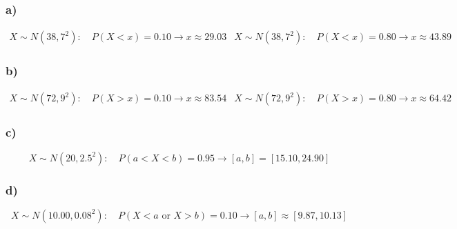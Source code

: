 	\subsubsection*{a)}
	\[
	\begin{array}{ll}
		X\sim N(38,7^2):\quad P(X<x)=0.10 \longrightarrow x\approx 29.03
		&
		X\sim N(38,7^2):\quad P(X<x)=0.80 \longrightarrow x\approx 43.89
	\end{array}
	\]
	
	\subsubsection*{b)}
	\[
	\begin{array}{ll}
		X\sim N(72,9^2):\quad P(X>x)=0.10 \longrightarrow x\approx 83.54
		&
		X\sim N(72,9^2):\quad P(X>x)=0.80 \longrightarrow x\approx 64.42
	\end{array}
	\]
	
	\subsubsection*{c)}
	\[
	X\sim N(20,2.5^2):\quad P(a<X<b)=0.95 \longrightarrow [a,b]=[15.10,24.90]
	\]
	
	\subsubsection*{d)}
	\[
	X\sim N(10.00,0.08^2):\quad P(X<a\text{ or }X>b)=0.10 \longrightarrow [a,b]\approx[9.87,10.13]
	\]
	
	

